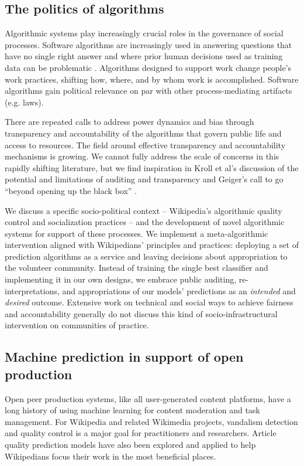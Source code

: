 \subsection{The politics of algorithms}
Algorithmic systems play increasingly crucial roles in the governance of social processes\cite{gillespie2014relevance}. Software algorithms are increasingly used in answering questions that have no single right answer and where prior human decisions used as training data can be problematic \cite{barocas2013governing}. Algorithms designed to support work change people's work practices, shifting how, where, and by whom work is accomplished\cite{crawford2016algorithm, zuboff1988age}. Software algorithms gain political relevance on par with other process-mediating artifacts (e.g. laws\cite{lessig1999code}).

There are repeated calls to address power dynamics and bias through transparency and accountability of the algorithms that govern public life and access to resources\cite{diakopoulos2017algorithmic,sandvig2014auditing}. The field around effective transparency and accountability mechanisms is growing. We cannot fully address the scale of concerns in this rapidly shifting literature, but we find inspiration in Kroll et al's discussion of the potential and limitations of auditing and transparency \cite{kroll2016accountable} and Geiger's call to go ``beyond opening up the black box'' \cite{geiger2017beyond}.

We discuss a specific socio-political context -- Wikipedia's algorithmic quality control and socialization practices -- and the development of novel algorithmic systems for support of these processes.  We implement a meta-algorithmic intervention aligned with Wikipedians' principles and practices: deploying a set of prediction algorithms as a service and leaving decisions about appropriation to the volunteer community.  Instead of training the single best classifier and implementing it in our own designs, we embrace public auditing, re-interpretations, and appropriations of our models' predictions as an \emph{intended} and \emph{desired} outcome.  Extensive work on technical and social ways to achieve fairness and accountability generally do not discuss this kind of socio-infrastructural intervention on communities of practice.

\subsection{Machine prediction in support of open production}
Open peer production systems, like all user-generated content platforms, have a long history of using machine learning for content moderation and task management. For Wikipedia and related Wikimedia projects, vandalism detection and quality control is a major goal for practitioners and researchers.  Article quality prediction models have also been explored and applied to help Wikipedians focus their work in the most beneficial places.

